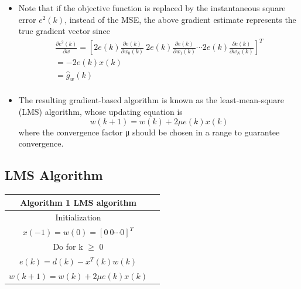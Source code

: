\documentclass{beamer}
\begin{document}
\begin{frame}
    \begin{itemize}
        \item Note that if the objective function is replaced by the instantaneous square error $e^2(k)$, instead of the MSE, the above gradient estimate represents the true gradient vector since
       \begin{multline}
       \frac{\partial e^2(k)}{\partial w}=\left[2e(k)\frac{\partial e(k)}{\partial w_0(k)} \ 2e(k)\frac{\partial e(k)}{\partial w_1(k)}\cdots 2e(k)\frac{\partial e(k)}{\partial w_N(k)}\right]^T\\
       =-2e(k)x(k)\\
       =\hat{g}_w(k)\\
       \end{multline}
       \item The resulting gradient-based algorithm is known as the least-mean-square (LMS) algorithm, whose updating equation is
       \begin{equation}
        w(k+1) = w(k) + 2\mu e(k)x(k)
       \end{equation}
       where the convergence factor μ should be chosen in a range to guarantee convergence. 
    \end{itemize}
\end{frame}

\subsection{LMS Algorithm}
\begin{frame}
    \begin{table}[h]
        \centering
        \begin{tabular}{c|c}
            \textbf{Algorithm 1} LMS algorithm  \\
            \hline
            Initialization\\
            $x(-1)=w(0)=[0 \ 0 \cdots 0]^T$\\
            Do for k $\geq$ 0 \\
            $e(k) = d(k)-x^T(k)w(k)$\\
            $w(k+1)=w(k)+2\mu e(k)x(k)$
        \end{tabular}
    \end{table}
\end{frame}
\end{document}
